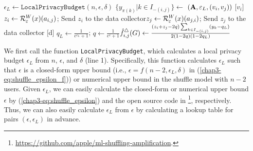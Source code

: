 \setlength{\algomargin}{5mm}
\begin{algorithm}[t]
  \SetAlgoLined
  $\epsilon_L \leftarrow \texttt{LocalPrivacyBudget}(n,\epsilon,\delta)$\;
  $\{y_{\pi(k)} | k \in I_{-(i,j)}\} \leftarrow$ \AlgWS{}$(\mathbf{A}, \varepsilon_L, (v_i, v_j))$\;
  [$v_i$] $z_i \leftarrow \mathcal{R}_{\varepsilon}^W(x)(a_{i,j})$; Send $z_i$ to the data collector\;
  [$v_j$] $z_j \leftarrow \mathcal{R}_{\varepsilon}^W(x)(a_{j,i})$; Send $z_j$ to the data collector\;
  [d] $q_L \leftarrow \frac{1}{e^{\epsilon_L}+1}$; $q \leftarrow
  \frac{1}{e^\epsilon+1}$\;
  [d] $\hat{f}_{i,j}^\triangle(G) \leftarrow \frac{(z_i+z_j-2q)\sum_{k \in
  I_{-(i,j)}} (y_{k} - q_L)}{2(1-2q)(1-2q_L)}$\;
  [d] 
  \caption[\AlgWSLE{} (Wedge Shuffling with Local Edges).]{\AlgWSLE{}
  (Wedge Shuffling with Local Edges).
  \AlgWS{} is shown in Algorithm~\ref{chap3-alg:WShuffle}.
  }\label{chap3-alg:WSLE}
\end{algorithm}

We first call the function \texttt{LocalPrivacyBudget}, which calculates a local privacy budget $\epsilon_L$ from $n$, $\epsilon$, and $\delta$ (line 1).
Specifically, this function calculates $\epsilon_L$
such that $\epsilon$ is a closed-form upper bound (i.e., $\epsilon = f(n-2, \epsilon_L, \delta)$ in (\ref{chap3-eq:shuffle_epsilon_f})) or numerical upper bound in the shuffle model with $n-2$ users.
Given $\epsilon_L$, we can easily calculate the closed-form or numerical upper bound $\epsilon$ by (\ref{chap3-eq:shuffle_epsilon}) and the open source code in \cite{Feldman_FOCS21}\footnote{\url{https://github.com/apple/ml-shuffling-amplification}.}, respectively.
Thus, we can also easily calculate $\epsilon_L$ from $\epsilon$ by calculating a lookup table for pairs $(\epsilon, \epsilon_L)$ in advance.

